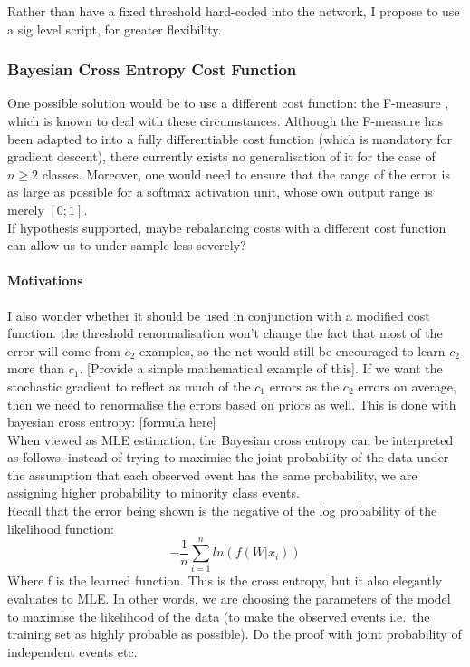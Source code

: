 \documentclass[a4paper,11pt]{article}
\begin{document}
Rather than have a fixed threshold hard-coded into the network, I propose to use a sig level script, for greater flexibility. \\

\subsubsection{Bayesian Cross Entropy Cost Function}

One possible solution would be to use a different cost function: the F-measure \cite{f-measure}, which is known to deal with these circumstances. Although the F-measure has been adapted to into a fully differentiable cost function (which is mandatory for gradient descent), there currently exists no generalisation of it for the case of $n \ge 2$
classes. Moreover, one would need to ensure that the range of the error is as large as possible for a softmax activation unit, whose own output range is merely $[0;1]$. \\ 

If hypothesis supported, maybe rebalancing costs with a different cost function can allow us to under-sample less severely? \\


\paragraph{Motivations}

I also wonder whether it should be used in conjunction with a modified cost function. the threshold renormalisation won't change the fact that most of the error will come from $c_2$ examples, so the net would still be encouraged to learn $c_2$ more than $c_1$. [Provide a simple mathematical example of this]. If we want the stochastic gradient to reflect as much of the $c_1$ errors as the $c_2$ errors on average, then we need to renormalise the errors based on priors as well. This is done with bayesian cross entropy: [formula here] \\

When viewed as MLE estimation, the Bayesian cross entropy can be interpreted as follows: instead of trying to maximise the joint probability of the data under the assumption that each observed event has the same probability, we are assigning higher probability to minority class events. \\

Recall that the error being shown is the negative of the log probability of the likelihood function:
\begin{equation}
-\frac{1}{n}\sum\limits_{i=1}^n ln(f(W|x_i))
\end{equation}
Where f is the learned function. This is the cross entropy, but it also elegantly evaluates to MLE. In other words, we are choosing the parameters of the model to maximise the likelihood of the data (to make the observed events i.e.\ the training set as highly probable as possible). Do the proof with joint probability of independent events etc. \\
\end{document}
